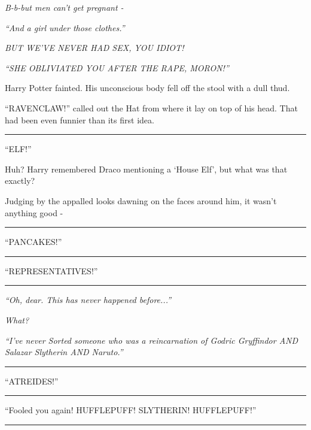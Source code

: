 \emph{B-b-but men can't get pregnant -}

\emph{``And a girl under those clothes.''}

\emph{BUT WE'VE NEVER HAD SEX, YOU IDIOT!}

\emph{``SHE OBLIVIATED YOU AFTER THE RAPE, MORON!''}

Harry Potter fainted. His unconscious body fell off the stool with a dull thud.

``RAVENCLAW!'' called out the Hat from where it lay on top of his head. That had been even funnier than its first idea.

\begin{center}\rule{3in}{0.4pt}\end{center}

``ELF!''

Huh? Harry remembered Draco mentioning a `House Elf', but what was that exactly?

Judging by the appalled looks dawning on the faces around him, it wasn't anything good -

\begin{center}\rule{3in}{0.4pt}\end{center}

``PANCAKES!''

\begin{center}\rule{3in}{0.4pt}\end{center}

``REPRESENTATIVES!''

\begin{center}\rule{3in}{0.4pt}\end{center}

\emph{``Oh, dear. This has never happened before...''}

\emph{What?}

\emph{``I've never Sorted someone who was a reincarnation of Godric Gryffindor AND Salazar Slytherin AND Naruto.''}

\begin{center}\rule{3in}{0.4pt}\end{center}

``ATREIDES!''

\begin{center}\rule{3in}{0.4pt}\end{center}

``Fooled you again! HUFFLEPUFF! SLYTHERIN! HUFFLEPUFF!''

\begin{center}\rule{3in}{0.4pt}\end{center}

